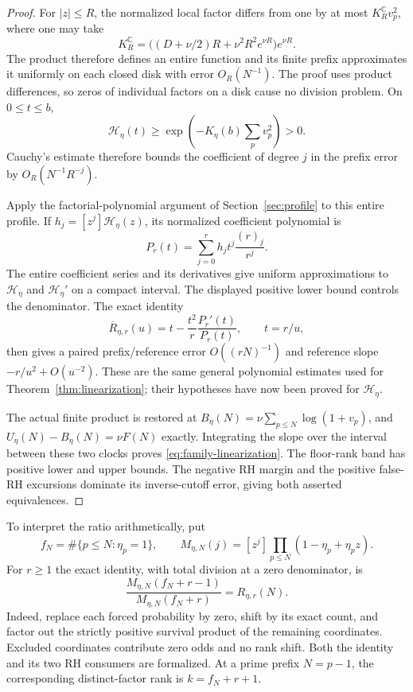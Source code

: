 \documentclass[11pt]{article}
\theoremstyle{definition}
\begin{document}
\begin{proof}
For $|z|\le R$, the normalized local factor differs from one by at most
$K_R^{\mathbb C}v_p^2$, where one may take
\[
 K_R^{\mathbb C}=
 \bigl((D+\nu/2)R+\nu^2R^2e^{\nu R}\bigr)e^{\nu R}.
\]
The product therefore defines an entire function and its finite
prefix approximates it uniformly on each closed disk with error
$O_R(N^{-1})$. The proof uses product differences, so zeros of
individual factors on a disk cause no division problem. On $0\le t\le b$,
\[
 \mathcal H_\eta(t)\ge
 \exp\left(-K_\eta(b)\sum_p v_p^2\right)>0.
\]
Cauchy's estimate therefore bounds the coefficient of degree $j$ in
the prefix error by $O_R(N^{-1}R^{-j})$.

Apply the factorial-polynomial argument of Section~\ref{sec:profile}
to this entire profile. If $h_j=[z^j]\mathcal H_\eta(z)$, its normalized
coefficient polynomial is
\[
 P_r(t)=\sum_{j=0}^r h_jt^j\frac{(r)_j}{r^j}.
\]
The entire coefficient series and its derivatives give uniform
approximations to $\mathcal H_\eta$ and $\mathcal H_\eta'$ on a
compact interval. The displayed positive lower bound controls the
denominator. The exact identity
\[
 \overline R_{\eta,r}(u)
 =t-\frac{t^2}{r}\frac{P_r'(t)}{P_r(t)},\qquad t=r/u,
\]
then gives a paired prefix/reference error $O((rN)^{-1})$ and reference
slope $-r/u^2+O(u^{-2})$. These are the same general polynomial
estimates used for Theorem~\ref{thm:linearization}; their hypotheses
have now been proved for $\mathcal H_\eta$.

The actual finite product is restored at
$B_\eta(N)=\nu\sum_{p\le N}\log(1+v_p)$, and
$U_\eta(N)-B_\eta(N)=\nu F(N)$ exactly. Integrating the slope over
the interval between these two clocks proves
\eqref{eq:family-linearization}. The floor-rank band has positive
lower and upper bounds. The negative RH margin and the positive
false-RH excursions dominate its inverse-cutoff error, giving
both asserted equivalences.
\end{proof}

To interpret the ratio arithmetically, put
\[
 f_N=\#\{p\le N:\eta_p=1\},\qquad
 M_{\eta,N}(j)=[z^j]\prod_{p\le N}(1-\eta_p+\eta_pz).
\]
For $r\ge1$ the exact identity, with total division at a zero denominator, is
\begin{equation}\label{eq:family-forced-ratio}
 \frac{M_{\eta,N}(f_N+r-1)}{M_{\eta,N}(f_N+r)}
   =R_{\eta,r}(N).
\end{equation}
Indeed, replace each forced probability by zero, shift by its exact
count, and factor out the strictly positive survival product of the
remaining coordinates. Excluded coordinates contribute zero odds and
no rank shift. Both the identity and its two RH consumers are
formalized. At a prime prefix $N=p-1$, the corresponding distinct-factor
rank is $k=f_N+r+1$.
\end{document}
